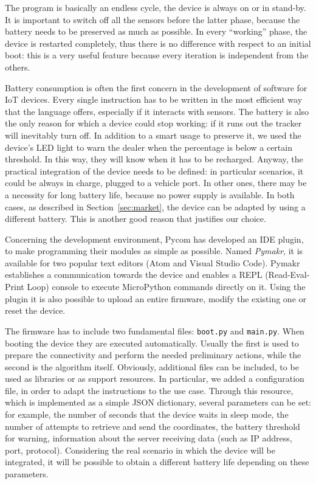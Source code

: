 The program is basically an endless cycle, the device is always on or in stand-by. It is important to switch off all the sensors before the latter phase, because the battery needs to be preserved as much as possible. In every ``working'' phase, the device is restarted completely, thus there is no difference with respect to an initial boot: this is a very useful feature because every iteration is independent from the others.

Battery consumption is often the first concern in the development of software for IoT devices. Every single instruction has to be written in the most efficient way that the language offers, especially if it interacts with sensors. The battery is also the only reason for which a device could stop working: if it runs out the tracker will inevitably turn off. In addition to a smart usage to preserve it, we used the device's LED light to warn the dealer when the percentage is below a certain threshold. In this way, they will know when it has to be recharged. Anyway, the practical integration of the device needs to be defined: in particular scenarios, it could be always in charge, plugged to a vehicle port. In other ones, there may be a necessity for long battery life, because no power supply is available. In both cases, as described in Section~\ref{sec:market}, the device can be adapted by using a different battery. This is another good reason that justifies our choice.

Concerning the development environment, Pycom has developed an IDE plugin, to make programming their modules as simple as possible. Named \emph{Pymakr}, it is available for two popular text editors (Atom and Visual Studio Code). Pymakr establishes a communication towards the device and enables a REPL (Read-Eval-Print Loop) console to execute MicroPython commands directly on it. Using the plugin it is also possible to upload an entire firmware, modify the existing one or reset the device.

The firmware has to include two fundamental files: \texttt{boot.py} and \texttt{main.py}. When booting the device they are executed automatically. Usually the first is used to prepare the connectivity and perform the needed preliminary actions, while the second is the algorithm itself. Obviously, additional files can be included, to be used as libraries or as support resources. In particular, we added a configuration file, in order to adapt the instructions to the use case. Through this resource, which is implemented as a simple JSON dictionary, several parameters can be set: for example, the number of seconds that the device waits in sleep mode, the number of attempts to retrieve and send the coordinates, the battery threshold for warning, information about the server receiving data (such as IP address, port, protocol). Considering the real scenario in which the device will be integrated, it will be possible to obtain a different battery life depending on these parameters.


